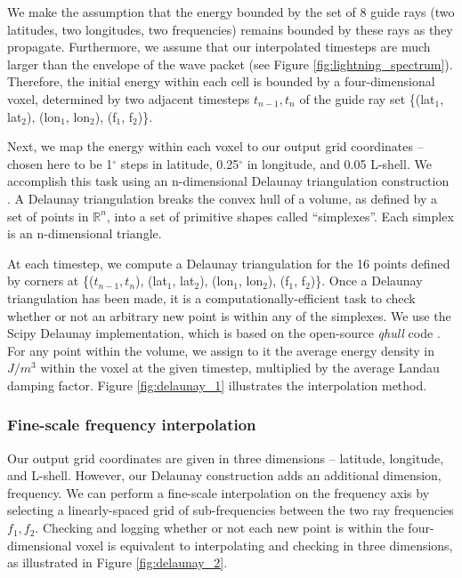 We make the assumption that the energy bounded by the set of 8 guide rays (two latitudes, two longitudes, two frequencies) remains bounded by these rays as they propagate. Furthermore, we assume that our interpolated timesteps are much larger than the envelope of the wave packet (see Figure \ref{fig:lightning_spectrum}). Therefore, the initial energy within each cell is bounded by a four-dimensional voxel, determined by two adjacent timesteps $t_{n-1}, t_n$ of the guide ray set \{(lat$_1$, lat$_2$), (lon$_1$, lon$_2$), (f$_1$, f$_2$)\}.

Next, we map the energy within each voxel to our output grid coordinates -- chosen here to be 1$^\circ$ steps in latitude, 0.25$^\circ$ in longitude, and 0.05 L-shell. We accomplish this task using an n-dimensional Delaunay triangulation construction \citep{Delaunay1934, Lee1980}. A Delaunay triangulation breaks the convex hull of a volume, as defined by a set of points in $\mathbb R^n$, into a set of primitive shapes called ``simplexes''. Each simplex is an n-dimensional triangle. 

At each timestep, we compute a Delaunay triangulation for the 16 points defined by corners at \{($t_{n-1}, t_n$), (lat$_1$, lat$_2$), (lon$_1$, lon$_2$), (f$_1$, f$_2$)\}. Once a Delaunay triangulation has been made, it is a computationally-efficient task to check whether or not an arbitrary new point is within any of the simplexes. We use the Scipy Delaunay implementation, which is based on the open-source \emph{qhull} code \citep{Barber1996}. For any point within the volume, we assign to it the average energy density in $J/m^3$ within the voxel at the given timestep, multiplied by the average Landau damping factor. Figure \ref{fig:delaunay_1} illustrates the interpolation method.

\subsubsection{Fine-scale frequency interpolation}
Our output grid coordinates are given in three dimensions -- latitude, longitude, and L-shell. However, our Delaunay construction adds an additional dimension, frequency. We can perform a fine-scale interpolation on the frequency axis by selecting a linearly-spaced grid of sub-frequencies between the two ray frequencies $f_1, f_2$. Checking and logging whether or not each new point is within the four-dimensional voxel is equivalent to interpolating and checking in three dimensions, as illustrated in Figure \ref{fig:delaunay_2}.

